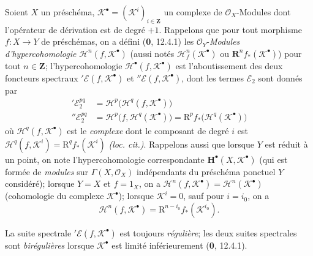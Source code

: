 \begin{env}[6.2.1]
Soient $X$ un préschéma,
$\mathscr K^\bullet=(\mathscr K^i)_{i\in\mathbf Z}$ un complexe de
$\mathscr O_X$-Modules dont l'opérateur de dérivation est de degré $+1$.
Rappelons que pour tout morphisme $f:X\to Y$ de préschémas, on a défini
(\textbf{0}, 12.4.1) les $\mathscr O_Y$-\emph{Modules d'hypercohomologie}
$\mathscr H^n(f,\mathscr K^\bullet)$ (aussi notés
$\mathscr H_f^n(\mathscr K^\bullet)$ ou
$\mathbf R^n f_*(\mathscr K^\bullet)$) pour tout $n\in\mathbf Z$;
l'hypercohomologie $\mathscr H^\bullet(f,\mathscr K^\bullet)$ est
l'aboutissement des deux foncteurs spectraux
$'\mathscr E(f,\mathscr K^\bullet)$ et
$''\mathscr E(f,\mathscr K^\bullet)$, dont les termes $\mathscr E_2$ sont
donnés par
\begin{align}
  '\mathscr E_2^{pq}
    &=\mathscr H^p\bigl(\mathscr H^q(f,\mathscr K^\bullet)\bigr)
    \tag{6.2.1.1}\label{III.6.2.1.1.fr}\\
  ''\mathscr E_2^{pq}
    &=\mathscr H^p\bigl(f,\mathscr H^q(\mathscr K^\bullet)\bigr)
      =\mathrm R^p f_*\bigl(\mathscr H^q(\mathscr K^\bullet)\bigr)
    \tag{6.2.1.2}\label{III.6.2.1.2.fr}
\end{align}
où $\mathscr H^q(f,\mathscr K^\bullet)$ est le \emph{complexe} dont le composant de
degré $i$ est
$\mathscr H^q(f,\mathscr K^i)=\mathrm R^q f_*(\mathscr K^i)$ \emph{(loc. cit.)}.
Rappelons aussi que lorsque $Y$ est réduit à un point, on note
l'hypercohomologie correspondante $\mathbf H^\bullet(X,\mathscr K^\bullet)$
(qui est formée de \emph{modules} sur $\Gamma(X,\mathscr O_X)$ indépendants du
préschéma ponctuel $Y$ considéré); lorsque $Y=X$ et $f=1_X$, on a
$\mathscr H^n(f,\mathscr K^\bullet)=\mathscr H^n(\mathscr K^\bullet)$
(cohomologie du complexe $\mathscr K^\bullet$); lorsque
$\mathscr K^i=0$, sauf pour $i=i_0$, on a
\[
  \mathscr H^n(f,\mathscr K^\bullet)
    =\mathrm R^{n-i_0}f_*(\mathscr K^{i_0}).
\]

La suite spectrale $'\mathscr E(f,\mathscr K^\bullet)$ est toujours
\emph{régulière}; les deux suites spectrales sont \emph{birégulières} lorsque
$\mathscr K^\bullet$ est limité inférieurement (\textbf{0}, 12.4.1).


\end{env}
